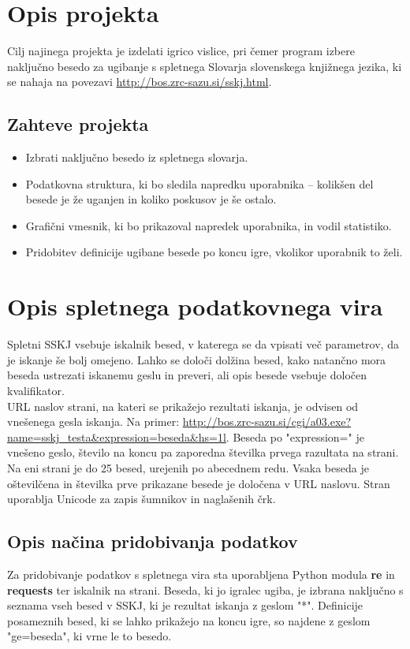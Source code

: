 \documentclass [a4paper, 12pt] {article}
\begin{document}
\section {Opis projekta}
Cilj najinega projekta je izdelati igrico vislice, pri čemer program izbere naključno besedo za ugibanje s spletnega Slovarja slovenskega knjižnega jezika, ki se nahaja na povezavi \url {http://bos.zrc-sazu.si/sskj.html}.
\subsection {Zahteve projekta}
\begin {itemize}
\item Izbrati naključno besedo iz spletnega slovarja.
\item Podatkovna struktura, ki bo sledila napredku uporabnika -- kolikšen del besede je že uganjen in koliko poskusov je še ostalo.
\item Grafični vmesnik, ki bo prikazoval napredek uporabnika, in vodil statistiko.
\item  Pridobitev definicije ugibane besede po koncu igre, vkolikor uporabnik to želi.
\end {itemize}

\section {Opis spletnega podatkovnega vira}
Spletni SSKJ vsebuje iskalnik besed, v katerega se da vpisati več parametrov, da je iskanje še bolj omejeno. Lahko se določi dolžina besed, kako natančno mora beseda ustrezati iskanemu geslu in preveri, ali opis besede vsebuje določen kvalifikator. \\
 URL naslov strani, na kateri se prikažejo rezultati iskanja, je odvisen od vnešenega gesla iskanja. Na primer: \url {http://bos.zrc-sazu.si/cgi/a03.exe?name=sskj_testa&expression=beseda&hs=1l}. Beseda po "expression=" je vnešeno geslo, število na koncu pa zaporedna številka prvega razultata na strani. \\
Na eni strani je do 25 besed, urejenih po abecednem redu. Vsaka beseda je oštevilčena in številka prve prikazane besede je določena v URL naslovu. Stran uporablja Unicode za zapis šumnikov in naglašenih črk.
\subsection {Opis načina pridobivanja podatkov}
Za pridobivanje podatkov s spletnega vira sta uporabljena Python modula \textbf {re} in \textbf {requests} ter iskalnik na strani. Beseda, ki jo igralec ugiba, je izbrana naključno s seznama vseh besed v SSKJ, ki je rezultat iskanja z geslom "*". Definicije posameznih besed, ki se lahko prikažejo na koncu igre, so najdene z geslom "ge=beseda", ki vrne le to besedo.
\end{document}
